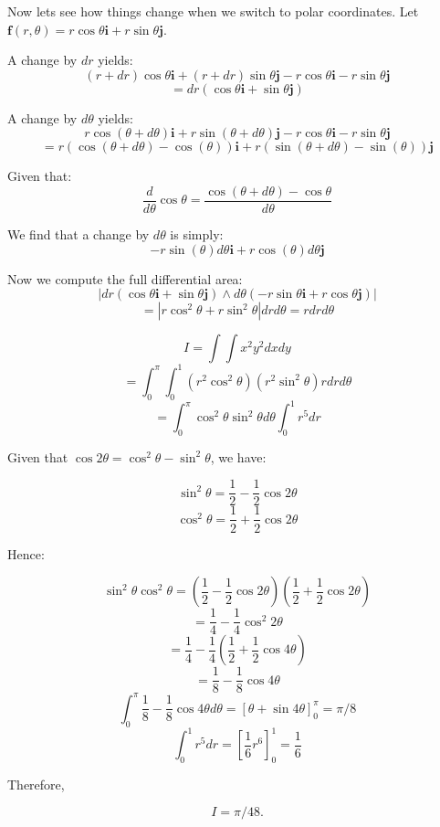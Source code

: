 \documentclass[a4paper,10pt]{article}
\begin{document}
Now lets see how things change when we switch to polar coordinates. Let
$\mathbf{f}(r,\theta) = r\cos\theta\mathbf{i} + r\sin\theta\mathbf{j}$.

A change by $dr$ yields:
\[ (r+dr)\cos\theta\mathbf{i} + (r+dr)\sin\theta\mathbf{j} -
r\cos\theta\mathbf{i} - r\sin\theta\mathbf{j} \]
\[ = dr(\cos\theta\mathbf{i} + \sin\theta\mathbf{j}) \]

A change by $d\theta$ yields:
\[ r\cos(\theta + d\theta)\mathbf{i} + r\sin(\theta + d\theta)\mathbf{j} -
r\cos\theta\mathbf{i} - r\sin\theta\mathbf{j} \]
\[ = r\left(\cos(\theta + d\theta) - \cos(\theta)\right)\mathbf{i}
+ r\left(\sin(\theta + d\theta) - \sin(\theta)\right)\mathbf{j} \]

Given that:
\[ \frac{d}{d\theta} \cos\theta = \frac{\cos(\theta + d\theta) -
\cos\theta}{d\theta} \]

We find that a change by $d\theta$ is simply:
\[ -r\sin(\theta)d\theta \mathbf{i} + r\cos(\theta)d\theta \mathbf{j} \]

Now we compute the full differential area:
\[ | dr(\cos\theta \mathbf{i} + \sin\theta \mathbf{j}) \wedge
d\theta(-r \sin\theta \mathbf{i} + r\cos\theta \mathbf{j}) | \]
\[ = | r\cos^2\theta + r\sin^2\theta | drd\theta = rdrd\theta \]

\begin{ex}
	\[ I = \int \int x^2 y^2 dxdy \]
	\[ = \int_0^{\pi} \int_0^1 (r^2 \cos^2\theta)(r^2 \sin^2\theta)
	rdrd\theta \]
	\[ = \int_0^{\pi} \cos^2\theta \sin^2\theta d\theta
	\int_0^1 r^5 dr \]

	Given that $\cos2\theta = \cos^2\theta - \sin^2\theta$, we have:

	\[ \sin^2\theta = \frac{1}{2} - \frac{1}{2} \cos2\theta \]
	\[ \cos^2\theta = \frac{1}{2} + \frac{1}{2} \cos2\theta \]

	Hence:

	\[
		\sin^2\theta \cos^2\theta =
		(\frac{1}{2} - \frac{1}{2} \cos2\theta)
		(\frac{1}{2} + \frac{1}{2} \cos2\theta)
	\]
	\[
		= \frac{1}{4} - \frac{1}{4} \cos^2 2\theta
	\]
	\[
		= \frac{1}{4} - \frac{1}{4}
		(\frac{1}{2} + \frac{1}{2} \cos4\theta)
	\]
	\[
		= \frac{1}{8} - \frac{1}{8} \cos4\theta
	\]
	\[
		\int_0^{\pi} \frac{1}{8} - \frac{1}{8} \cos4\theta d\theta =
		\left[ \theta + \sin4\theta \right]_0^{\pi} = \pi/8
	\]
	\[
		\int_0^1 r^5 dr = \left[ \frac{1}{6} r^6 \right]_0^1
		= \frac{1}{6}
	\]

	Therefore,

	\[ I = \pi/48. \]

\end{ex}
\end{document}
